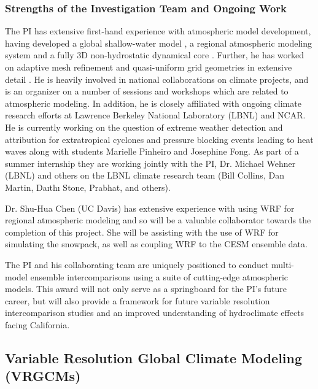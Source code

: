 \documentclass[11pt]{article}
\begin{document}
\subsubsection{Strengths of the Investigation Team and Ongoing Work}
The PI has extensive first-hand experience with atmospheric model development, having developed a global shallow-water model \citep{ullrich2010high}, a regional atmospheric modeling system \citep{ullrich2012operator} and a fully 3D non-hydrostatic dynamical core \citep{ullrich2012mcore}. Further, he has worked on adaptive mesh refinement and quasi-uniform grid geometries in extensive detail \citep{collins2013nonhydrostatic}. He is heavily involved in national collaborations on climate projects, and is an organizer on a number of sessions and workshops which are related to atmospheric modeling. In addition, he is closely affiliated with ongoing climate research efforts at Lawrence Berkeley National Laboratory (LBNL) and NCAR. He is currently working on the question of extreme weather detection and attribution for extratropical cyclones and pressure blocking events leading to heat waves along with students Marielle Pinheiro and Josephine Fong. As part of a summer internship they are working jointly with the PI, Dr. Michael Wehner (LBNL) and others on the LBNL climate research team (Bill Collins, Dan Martin, Daıthı Stone, Prabhat, and others).

Dr.  Shu-Hua Chen (UC Davis) has extensive experience with using WRF for regional atmospheric modeling and so will be a valuable collaborator towards the completion of this project. She will be assisting with the use of WRF for simulating the snowpack, as well as coupling WRF to the CESM ensemble data.

The PI and his collaborating team are uniquely positioned to conduct multi-model ensemble intercomparisons using a suite of cutting-edge atmospheric models. This award will not only serve as a springboard for the PI’s future career, but will also provide a framework for future variable resolution intercomparison studies and an improved understanding of hydroclimate effects facing California.

\subsection{Variable Resolution Global Climate Modeling (VRGCMs)}
\end{document}

